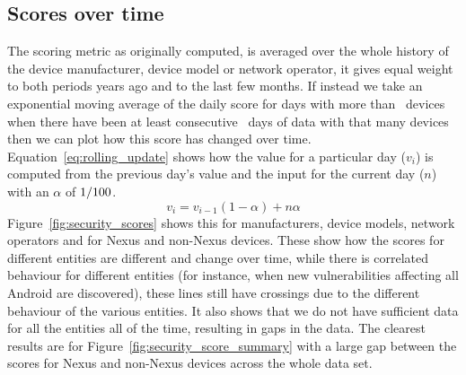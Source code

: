 \subsection{Scores over time}
The scoring metric as originally computed, is averaged over the whole history of the device manufacturer, device model or network operator, it gives equal weight to both periods years ago and to the last few months.
If instead we take an exponential moving average of the daily score for days with more than \daSigNumDevicesDay\, devices when there have been at least consecutive \daSigNumDays\, days of data with that many devices then we can plot how this score has changed over time.
Equation~\ref{eq:rolling_update} shows how the value for a particular day ($v_i$) is computed from the previous day's value and the input for the current day ($n$) with an $\alpha$ of $1/100$.
\begin{equation}
v_i = v_{i-1} (1 - \alpha) + n \alpha
\label{eq:rolling_update}
\end{equation}
Figure~\ref{fig:security_scores} shows this for manufacturers, device models, network operators and for Nexus and non-Nexus devices.
These show how the scores for different entities are different and change over time, while there is correlated behaviour for different entities (for instance, when new vulnerabilities affecting all Android are discovered), these lines still have crossings due to the different behaviour of the various entities.
It also shows that we do not have sufficient data for all the entities all of the time, resulting in gaps in the data.
The clearest results are for Figure~\ref{fig:security_score_summary} with a large gap between the scores for Nexus and non-Nexus devices across the whole data set.
